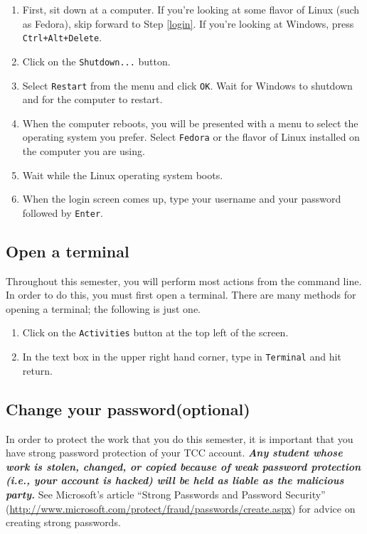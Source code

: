 \documentclass[12pt]{article}
\begin{document}
\begin{enumerate}
\item First, sit down at a computer. If you're looking at some flavor of Linux (such as Fedora), skip forward to Step \ref{login}. If you're looking at Windows, press \texttt{Ctrl+Alt+Delete}.
\item Click on the \texttt{Shutdown...} button.
\item Select \texttt{Restart} from the menu and click \texttt{OK}. Wait for Windows to shutdown and for the computer to restart.
\item When the computer reboots, you will be presented with a menu to select the operating system you prefer. Select \texttt{Fedora} or the flavor of Linux installed on the computer you are using.
\item Wait while the Linux operating system boots.
\item \label{login} When the login screen comes up, type your username and your password followed by \texttt{Enter}.
\end{enumerate}

\subsection{Open a terminal}
Throughout this semester, you will perform most actions from the command line. In order to do this, you must first open a terminal. There are many methods for opening a terminal; the following is just one.

\begin{enumerate}
\item Click on the \texttt{Activities} button at the top left of the screen.
\item In the text box in the upper right hand corner, type in
  \texttt{Terminal} and hit return.
\end{enumerate}

\subsection{Change your password(optional)}
In order to protect the work that you do this semester, it is important that you have strong password protection of your TCC account. \textbf{\textit{Any student whose work is stolen, changed, or copied because of weak password protection (i.e., your account is hacked) will be held as liable as the malicious party.}} See Microsoft's article ``Strong Passwords and Password Security'' (\url{http://www.microsoft.com/protect/fraud/passwords/create.aspx}) for advice on creating strong passwords.
\end{document}
